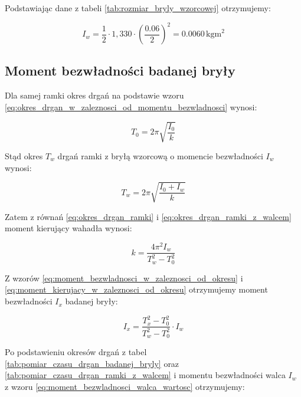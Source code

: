 \documentclass[a4paper,12pt]{article}
\begin{document}
Podstawiając dane z tabeli \ref{tab:rozmiar_bryly_wzorcowej} otrzymujemy:

\begin{equation} \label{eq:moment_bezwladnosci_walca_wartosc}
    I_w = \frac{1}{2} \cdot 1,330 \cdot \left(\frac{0.06}{2}\right)^2 = 0.0060\,\text{kgm}^2
\end{equation}


\subsection{Moment bezwładności badanej bryły} \label{sec:moment_bezwladnosci_badanej_bryly}

Dla samej ramki okres drgań na podstawie wzoru \ref{eq:okres_drgan_w_zaleznosci_od_momentu_bezwladnosci} wynosi:

\begin{equation} \label{eq:okres_drgan_ramki}
    T_0 = 2\pi \sqrt{\frac{I_0}{k}}
\end{equation}

Stąd okres $T_w$ drgań ramki z bryłą wzorcową o momencie bezwładności $I_w$ wynosi:

\begin{equation} \label{eq:okres_drgan_ramki_z_walcem}
    T_w = 2\pi \sqrt{\frac{I_0 + I_w}{k}}
\end{equation}

Zatem z równań \eqref{eq:okres_drgan_ramki} i \eqref{eq:okres_drgan_ramki_z_walcem} moment kierujący wahadła wynosi:

\begin{equation} \label{eq:moment_kierujacy_w_zaleznosci_od_okresu}
    k = \frac{4\pi^2 I_w}{T_w^2 - T_0^2}
\end{equation}

Z wzorów \eqref{eq:moment_bezwladnosci_w_zaleznosci_od_okresu} i \eqref{eq:moment_kierujacy_w_zaleznosci_od_okresu} otrzymujemy moment bezwładności $I_x$ badanej bryły:

\begin{equation} \label{eq:moment_bezwladnosci_badanej_bryly}
    I_x = \frac{T_x^2 - T_0^2}{T_w^2 - T_0^2} \cdot I_w
\end{equation}

Po podstawieniu okresów drgań z tabel \ref{tab:pomiar_czasu_drgan_badanej_bryly} oraz \ref{tab:pomiar_czasu_drgan_ramki_z_walcem} i momentu bezwładności walca $I_w$ z wzoru \eqref{eq:moment_bezwladnosci_walca_wartosc} otrzymujemy:
\end{document}
